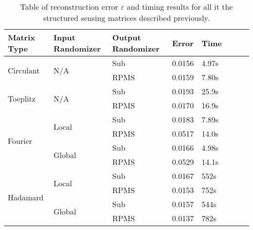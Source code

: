 \begin{table}[h]
\begin{tabular}{lll|lllll}
	\textbf{Matrix Type}       & \textbf{Input Randomizer} & \textbf{Output Randomizer} & \textbf{Error} & \textbf{Time} & \\ \hline
	\multirow{2}{*}{Circulant} & \multirow{2}{*}{N/A}      & Sub                        & 0.0156         & 4.97s         & \\
	                           &                           & RPMS                       & 0.0159         & 7.80s         & \\ \hline


	\multirow{2}{*}{Toeplitz}  & \multirow{2}{*}{N/A}      & Sub                        & 0.0193         & 25.9s         & \\
	                           &                           & RPMS                       & 0.0170         & 16.9s         & \\ \hline

	\multirow{4}{*}{Fourier}   & \multirow{2}{*}{Local}    & Sub                        & 0.0183         & 7.89s         & \\
	                           &                           & RPMS                       & 0.0517         & 14.0s         & \\
	                           & \multirow{2}{*}{Global}   & Sub                        & 0.0166         & 4.98s         & \\
	                           &                           & RPMS                       & 0.0529         & 14.1s         & \\ \hline

	\multirow{4}{*}{Hadamard}  & \multirow{2}{*}{Local}    & Sub                        & 0.0167         & 552s          & \\
	                           &                           & RPMS                       & 0.0153         & 752s          & \\
	                           & \multirow{2}{*}{Global}   & Sub                        & 0.0157         & 544s          & \\
	                           &                           & RPMS                       & 0.0137         & 782s          & \\
\end{tabular}
\caption{Table of reconstruction error $\varepsilon$ and timing results for all it the structured sensing matrices described previously.}
\label{tab:errors}
\end{table}

